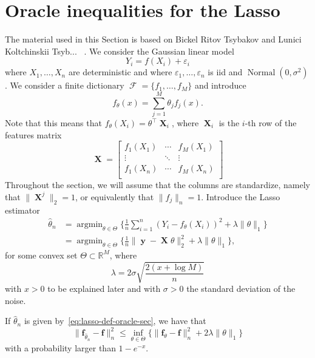 \documentclass[
	fontsize=11pt, %
	twoside=false, %
	numbers=noenddot, %
]{kaobook}
\DeclareMathOperator{\cF}{{\mathcal F}}
\DeclareMathOperator{\bX}{{\boldsymbol X}}
\renewcommand{\bf}{{\boldsymbol f}}
\DeclareMathOperator{\by}{{\boldsymbol y}}
\DeclareMathOperator{\nor}{Normal}
\DeclareMathOperator*{\argmin}{argmin}
\newcommand{\eps}{\varepsilon}
\newcommand{\R}{\mathbb R}
\newcommand{\wh}{\widehat}
\newcommand{\norm}[1]{\| #1 \|}
\begin{document}
\section{Oracle inequalities for the Lasso} %

The material used in this Section is based on Bickel Ritov Tsybakov and Lunici Koltchinskii Tsyb... ~\sidecite{}.
We consider the Gaussian linear model
\begin{equation*}
	Y_i = f(X_i) + \eps_i
\end{equation*}
where $X_1, \ldots, X_n$ are deterministic and where $\eps_1, \ldots, \eps_n$ is iid and $\nor(0, \sigma^2)$.
We consider a finite dictionary $\cF = \{ f_1, \ldots, f_M \}$ and introduce
\begin{equation*}
	f_\theta(x) = \sum_{j=1}^M \theta_j f_j(x).
\end{equation*}
Note that this means that $f_\theta(X_i) = \theta^\top \bX_i$, where $\bX_i$ is the $i$-th row of the features matrix
\begin{equation*}
	\bX = \begin{bmatrix}
		f_1(X_1) & \cdots & f_M(X_1) \\
		\vdots & \ddots & \vdots \\ 
		f_1(X_n) & \cdots & f_M(X_n) \\
	\end{bmatrix}
\end{equation*}
Throughout the section, we will assume that the columns are standardize, namely that $\norm{\bX^j}_2 = 1$, or equivalently that $\norm{f_j}_n = 1$.
Introduce the Lasso estimator
\begin{equation}
	\label{eq:lasso-def-oracle-sec}
	\begin{split}
	\wh \theta_n &= \argmin_{\theta \in \Theta} \Big\{ \frac 1n \sum_{i=1}^n (Y_i - f_\theta(X_i))^2 + \lambda \norm{\theta}_1 \Big\} \\
	&= \argmin_{\theta \in \Theta} \Big\{ 
	\frac 1n \norm{\by - \bX \theta}_2^2 + \lambda \norm{\theta}_1 
	\Big\},
	\end{split}
\end{equation}
for some convex set $\Theta \subset \R^M$, where 
\begin{equation*}
	\lambda = 2 \sigma \sqrt{\frac{2(x + \log M)}{n}}
\end{equation*}
with $x > 0$ to be explained later and with $\sigma > 0$ the standard deviation of the noise. \todo{notation pour $\bf$ et autres}
\begin{theorem}
	\label{thm:oracle-slow}
	If $\wh \theta_n$ is given by~\eqref{eq:lasso-def-oracle-sec}, we have that
	\begin{equation*}
		\norm{\bf_{\wh \theta_n} - \bf}_n^2 \leq \inf_{\theta \in \Theta} 
		\Big\{ \norm{\bf_{\theta} - \bf}_n^2  + 2 \lambda \norm{\theta}_1 \Big\}
	\end{equation*}
	with a probability larger than $1 - e^{-x}$.
\end{theorem}
\end{document}
